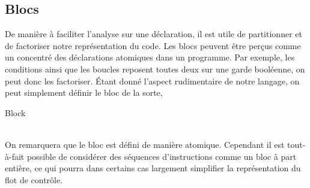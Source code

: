 \documentclass[a4paper, 11pt]{article}
\begin{document}
\subsection{Blocs}
De manière à faciliter l'analyse sur une déclaration, il est utile de partitionner et de factoriser notre représentation du code. 
Les blocs peuvent être perçus comme un concentré des déclarations atomiques dans un programme. Par exemple, les conditions ainsi
que les boucles reposent toutes deux sur une garde booléenne, on peut donc les factoriser. 
Étant donné l'aspect rudimentaire de notre langage, on peut simplement définir le bloc de la sorte,

\begin{dtype}{Block}
	\\
	\\
	\akind{\sskip}
\end{dtype}

On remarquera que le bloc est défini de manière atomique. Cependant il est tout-à-fait possible de considérer des séquences
d'instructions comme un bloc à part entière, ce qui pourra dans certains cas largement simplifier la représentation du flot
de contrôle.
\end{document}

